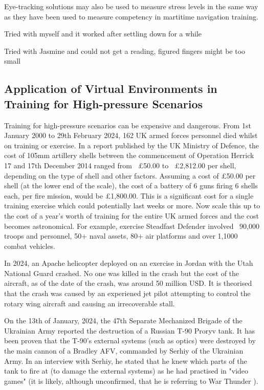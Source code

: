 \documentclass[12pt]{article}
\begin{document}
Eye-tracking solutions may also be used to measure stress levels in the same way as they have been used to measure competency in martitime navigation training. \cite{atik2019use}



Tried with myself and it worked after settling down for a while

Tried with Jasmine and could not get a reading, figured fingers might be too small




\subsection{Application of Virtual Environments in Training for High-pressure Scenarios} \label{sec:applicationsOfVirtualEnvironments}

Training for high-pressure scenarios can be expensive and dangerous. From 1st January 2000 to 29th February 2024, 162 UK armed forces personnel died whilst on training or exercise. \cite{ukmod2024} In a report published by the UK Ministry of Defence, the cost of 105mm artillery shells between the commencement of Operation Herrick 17 and 17th December 2014 ranged from ~£50.00 to ~£2,812.00 per shell, depending on the type of shell and other factors. \cite{ukmod2015} Assuming a cost of £50.00 per shell (at the lower end of the scale), the cost of a battery of 6 guns firing 6 shells each, per fire mission, would be £1,800.00. This is a significant cost for a single training exercise which could potentially last weeks or more. Now scale this up to the cost of a year's worth of training for the entire UK armed forces and the cost becomes astronomical. For example, exercise Steadfast Defender involved ~90,000 troops and personnel, 50+ naval assets, 80+ air platforms and over 1,1000 combat vehicles. \cite{steadfastdefender24}

In 2024, an Apache helicopter deployed on an exercise in Jordan with the Utah National Guard crashed. \cite{intergalactic2024} No one was killed in the crash but the cost of the aircraft, as of the date of the crash, was around 50 million USD. \cite{cbsaustin2024} It is theorised that the crash was caused by an experiened jet pilot attempting to control the rotary wing aircraft and causing an irrecoverable stall. \cite{carlisle2024}

On the 13th of January, 2024, the 47th Separate Mechanized Brigade of the Ukrainian Army reported the destruction of a Russian T-90 Proryv tank. \cite{malyasov2024} It has been proven that the T-90's external systems (such as optics) were destroyed by the main cannon of a Bradley AFV, commanded by Serhiy of the Ukrainian Army. In an interview with Serhiy, he stated that he knew which parts of the tank to fire at (to damage the external systems) as he had practised in "video games" \cite{militaryconflict2025} (it is likely, although unconfirmed, that he is referring to War Thunder \cite{warthunder}).
\end{document}
